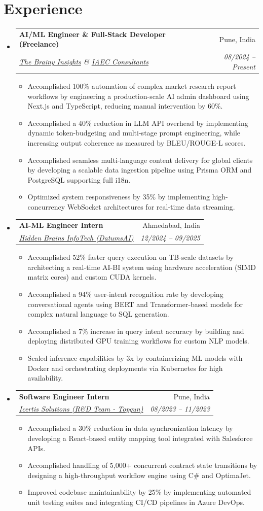 \documentclass[10pt,a4paper]{article}
\makeatletter
\newcommand{\resumeItem}[1]{\item\small{#1}}
\newcommand{\resumeSubheading}[4]{
  \vspace{-1pt}\item
    \begin{tabular*}{1.0\textwidth}[t]{l@{\extracolsep{\fill}}r}
      \textbf{#1} & #2 \\
      \textit{\small#3} & \textit{\small #4} \\
    \end{tabular*}\vspace{-5pt}
}
\makeatother
\begin{document}
\section{Experience}
\begin{itemize}[label={}]
    \resumeSubheading
      {AI/ML Engineer \& Full-Stack Developer (Freelance)}{Pune, India}
      {\href{https://thebrainyinsights.com}{The Brainy Insights} \& \href{https://iaec.co.in}{IAEC Consultants}}{08/2024 -- Present}
      \begin{itemize}
        \resumeItem{Accomplished 100\% automation of complex market research report workflows by engineering a production-scale AI admin dashboard using Next.js and TypeScript, reducing manual intervention by 60\%.}
        \resumeItem{Accomplished a 40\% reduction in LLM API overhead by implementing dynamic token-budgeting and multi-stage prompt engineering, while increasing output coherence as measured by BLEU/ROUGE-L scores.}
        \resumeItem{Accomplished seamless multi-language content delivery for global clients by developing a scalable data ingestion pipeline using Prisma ORM and PostgreSQL supporting full i18n.}
        \resumeItem{Optimized system responsiveness by 35\% by implementing high-concurrency WebSocket architectures for real-time data streaming.}
      \end{itemize}

    \resumeSubheading
      {AI-ML Engineer Intern}{Ahmedabad, India}
      {\href{https://hiddenbrains.com}{Hidden Brains InfoTech (DatumsAI)}}{12/2024 -- 09/2025}
      \begin{itemize}
        \resumeItem{Accomplished 52\% faster query execution on TB-scale datasets by architecting a real-time AI-BI system using hardware acceleration (SIMD matrix cores) and custom CUDA kernels.}
        \resumeItem{Accomplished a 94\% user-intent recognition rate by developing conversational agents using BERT and Transformer-based models for complex natural language to SQL generation.}
        \resumeItem{Accomplished a 7\% increase in query intent accuracy by building and deploying distributed GPU training workflows for custom NLP models.}
        \resumeItem{Scaled inference capabilities by 3x by containerizing ML models with Docker and orchestrating deployments via Kubernetes for high availability.}
      \end{itemize}

    \resumeSubheading
      {Software Engineer Intern}{Pune, India}
      {\href{https://icertis.com}{Icertis Solutions (R\&D Team - Topgun)}}{08/2023 -- 11/2023}
      \begin{itemize}
        \resumeItem{Accomplished a 30\% reduction in data synchronization latency by developing a React-based entity mapping tool integrated with Salesforce APIs.}
        \resumeItem{Accomplished handling of 5,000+ concurrent contract state transitions by designing a high-throughput workflow engine using C\# and OptimaJet.}
        \resumeItem{Improved codebase maintainability by 25\% by implementing automated unit testing suites and integrating CI/CD pipelines in Azure DevOps.}
      \end{itemize}
\end{itemize}
\end{document}
